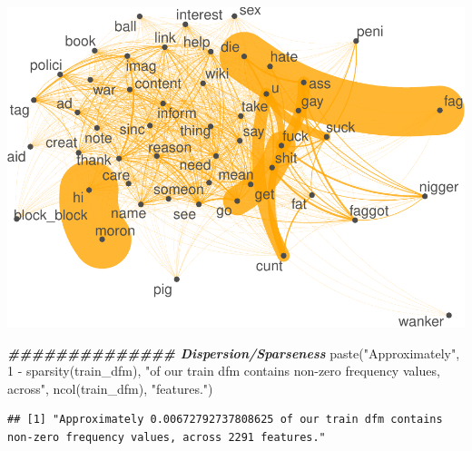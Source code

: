 \documentclass[
]{article}
\newenvironment{Shaded}{\begin{snugshade}}{\end{snugshade}}
\newcommand{\AttributeTok}[1]{\textcolor[rgb]{0.77,0.63,0.00}{#1}}
\newcommand{\CommentTok}[1]{\textcolor[rgb]{0.56,0.35,0.01}{\textit{#1}}}
\newcommand{\ConstantTok}[1]{\textcolor[rgb]{0.00,0.00,0.00}{#1}}
\newcommand{\DecValTok}[1]{\textcolor[rgb]{0.00,0.00,0.81}{#1}}
\newcommand{\DocumentationTok}[1]{\textcolor[rgb]{0.56,0.35,0.01}{\textbf{\textit{#1}}}}
\newcommand{\FunctionTok}[1]{\textcolor[rgb]{0.00,0.00,0.00}{#1}}
\newcommand{\NormalTok}[1]{#1}
\newcommand{\OtherTok}[1]{\textcolor[rgb]{0.56,0.35,0.01}{#1}}
\newcommand{\SpecialCharTok}[1]{\textcolor[rgb]{0.00,0.00,0.00}{#1}}
\newcommand{\StringTok}[1]{\textcolor[rgb]{0.31,0.60,0.02}{#1}}
\begin{document}
\includegraphics{classifier_files/figure-latex/eda-2.pdf}

\begin{Shaded}
\begin{Highlighting}[]
\DocumentationTok{\#\#\#\#\#\#\#\#\#\#\#\#\#\# Dispersion/Sparseness}
\FunctionTok{paste}\NormalTok{(}\StringTok{"Approximately"}\NormalTok{, }\DecValTok{1} \SpecialCharTok{{-}} \FunctionTok{sparsity}\NormalTok{(train\_dfm), }\StringTok{"of our train dfm contains non{-}zero frequency values, across"}\NormalTok{, }\FunctionTok{ncol}\NormalTok{(train\_dfm), }\StringTok{"features."}\NormalTok{)}
\end{Highlighting}
\end{Shaded}

\begin{verbatim}
## [1] "Approximately 0.00672792737808625 of our train dfm contains non-zero frequency values, across 2291 features."
\end{verbatim}

\begin{Shaded}
\end{Shaded}
\end{document}
